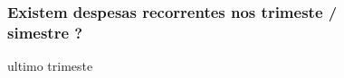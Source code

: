\documentclass[
  8pt,
  a4paper,
  DIV=11,
  numbers=noendperiod]{scrartcl}
\begin{document}
\begin{figure}

\begin{minipage}{0.50\linewidth}

\subsubsection{Existem despesas recorrentes nos trimeste / simestre
?}\label{existem-despesas-recorrentes-nos-trimeste-simestre}

ultimo trimeste\end{minipage}%
%
\begin{minipage}{0.50\linewidth}

\end{minipage}%
\newline
\begin{minipage}{0.50\linewidth}


\end{minipage}
\end{figure}
\end{document}
